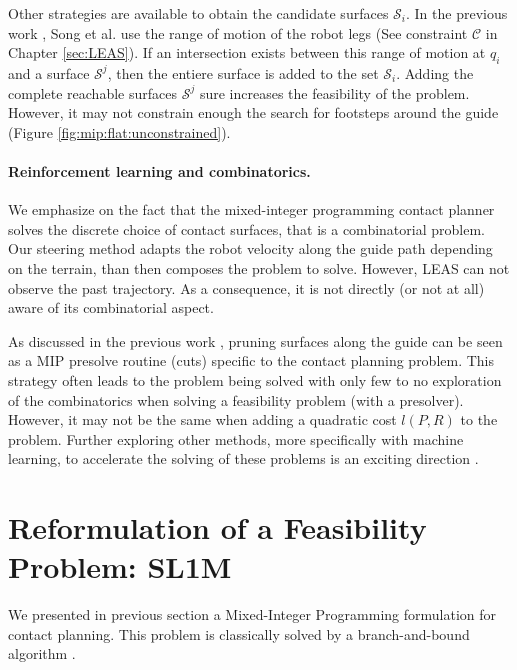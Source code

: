 Other strategies are available to obtain the candidate surfaces $\mathcal{S}_i$.
In the previous work \cite{sl1m_v2}, Song et al. use the range of motion of the robot legs (See constraint $\mathcal{C}$ in Chapter \ref{sec:LEAS}).
If an intersection exists between this range of motion at $q_i$ and a surface $\mathcal{S}^j$, then the entiere surface is added to the set $\mathcal{S}_i$.
Adding the complete reachable surfaces $\mathcal{S}^j$ sure increases the feasibility of the problem. 
However, it may not constrain enough the search for footsteps around the guide (Figure \ref{fig:mip:flat:unconstrained}).


\paragraph{Reinforcement learning and combinatorics.}

We emphasize on the fact that the mixed-integer programming contact planner solves the discrete choice of contact surfaces, that is a combinatorial problem.
Our steering method adapts the robot velocity along the guide path depending on the terrain, than then composes the problem to solve. 
However, LEAS can not observe the past trajectory. 
As a consequence, it is not directly (or not at all) aware of its combinatorial aspect. 

As discussed in the previous work \cite{sl1m_v2}, pruning surfaces along the guide can be seen as a MIP presolve routine (cuts) specific to the contact planning problem.
This strategy often leads to the problem being solved with only few to no exploration of the combinatorics when solving a feasibility problem (with a presolver). 
However, it may not be the same when adding a quadratic cost $l(P,R)$ to the problem. 
Further exploring other methods, more specifically with machine learning, to accelerate the solving of these problems is an exciting direction \cite{deepmind_RL_MIP}.




\section{Reformulation of a Feasibility Problem: SL1M}
\label{sub:mip:sl1m}
We presented in previous section a Mixed-Integer Programming formulation for contact planning.
This problem is classically solved by a branch-and-bound algorithm \cite{gurobi_mip}.

